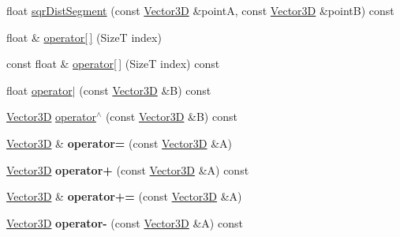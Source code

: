 \begin{DoxyCompactItemize}
\item 
float \hyperlink{classdrider_s_d_k_1_1_vector3_d_a17428bbe32652edcba681b55e27853b2}{sqr\+Dist\+Segment} (const \hyperlink{classdrider_s_d_k_1_1_vector3_d}{Vector3D} \&pointA, const \hyperlink{classdrider_s_d_k_1_1_vector3_d}{Vector3D} \&pointB) const
\item 
float \& \hyperlink{classdrider_s_d_k_1_1_vector3_d_ac7f67c8043cc9f9d801a7e7a2f2580a7}{operator\mbox{[}$\,$\mbox{]}} (SizeT index)
\item 
const float \& \hyperlink{classdrider_s_d_k_1_1_vector3_d_a54c01f85259ba8f84eb37dcf1001e59e}{operator\mbox{[}$\,$\mbox{]}} (SizeT index) const
\item 
float \hyperlink{classdrider_s_d_k_1_1_vector3_d_a4681c3fae6e11a1bc33100f638a8bb25}{operator$\vert$} (const \hyperlink{classdrider_s_d_k_1_1_vector3_d}{Vector3D} \&B) const
\item 
\hyperlink{classdrider_s_d_k_1_1_vector3_d}{Vector3D} \hyperlink{classdrider_s_d_k_1_1_vector3_d_a174bcd0e5030b457337a74c90ab061fe}{operator$^\wedge$} (const \hyperlink{classdrider_s_d_k_1_1_vector3_d}{Vector3D} \&B) const
\item 
\mbox{\label{classdrider_s_d_k_1_1_vector3_d_a6f290466b4c2583b0687861372bd6bd2}} 
\hyperlink{classdrider_s_d_k_1_1_vector3_d}{Vector3D} \& {\bfseries operator=} (const \hyperlink{classdrider_s_d_k_1_1_vector3_d}{Vector3D} \&A)
\item 
\mbox{\label{classdrider_s_d_k_1_1_vector3_d_a070a52602fede494fe8001dbbcdb7b82}} 
\hyperlink{classdrider_s_d_k_1_1_vector3_d}{Vector3D} {\bfseries operator+} (const \hyperlink{classdrider_s_d_k_1_1_vector3_d}{Vector3D} \&A) const
\item 
\mbox{\label{classdrider_s_d_k_1_1_vector3_d_ae5d5813d5376850d0a9a8c3f7af02c44}} 
\hyperlink{classdrider_s_d_k_1_1_vector3_d}{Vector3D} \& {\bfseries operator+=} (const \hyperlink{classdrider_s_d_k_1_1_vector3_d}{Vector3D} \&A)
\item 
\mbox{\label{classdrider_s_d_k_1_1_vector3_d_a04bdf7e8cb2ccc0b88dc521a6d5f0293}} 
\hyperlink{classdrider_s_d_k_1_1_vector3_d}{Vector3D} {\bfseries operator-\/} (const \hyperlink{classdrider_s_d_k_1_1_vector3_d}{Vector3D} \&A) const
\item 

\end{DoxyCompactItemize}
